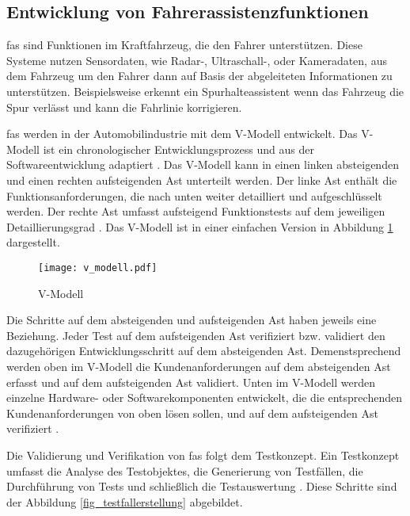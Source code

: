 \subsection{Entwicklung von Fahrerassistenzfunktionen}
\label{grundlagen_fahren_entwicklung}

\gls{fas} sind Funktionen im Kraftfahrzeug, die den Fahrer unterstützen. Diese Systeme nutzen Sensordaten, wie Radar-, Ultraschall-, oder Kameradaten, aus dem Fahrzeug um den Fahrer dann auf Basis der abgeleiteten Informationen zu unterstützen. Beispielsweise erkennt ein Spurhalteassistent wenn das Fahrzeug die Spur verlässt und kann die Fahrlinie korrigieren. 

\gls{fas} werden in der Automobilindustrie mit dem V-Modell entwickelt. Das V-Modell ist ein chronologischer Entwicklungsprozess und aus der Softwareentwicklung adaptiert \cite{vmodell2005}. Das V-Modell kann in einen linken absteigenden und einen rechten aufsteigenden Ast unterteilt werden. Der linke Ast enthält die Funktionsanforderungen, die nach unten weiter detailliert und aufgeschlüsselt werden. Der rechte Ast umfasst aufsteigend Funktionstests auf dem jeweiligen Detaillierungsgrad \cite{hakuli2015virtuelle}. Das V-Modell ist in einer einfachen Version in Abbildung \ref{fig_v_modell} dargestellt.

\begin{figure}[h]
\centering
\texttt{[image: v\_modell.pdf]}
\caption{V-Modell \cite{hakuli2015virtuelle}}
\label{fig_v_modell}
\end{figure}

Die Schritte auf dem absteigenden und aufsteigenden Ast haben jeweils eine Beziehung. Jeder Test auf dem aufsteigenden Ast verifiziert bzw. validiert den dazugehörigen Entwicklungsschritt auf dem absteigenden Ast. Demenstsprechend werden oben im V-Modell die Kundenanforderungen auf dem absteigenden Ast erfasst und auf dem aufsteigenden Ast validiert. Unten im V-Modell werden einzelne Hardware- oder Softwarekomponenten entwickelt, die die entsprechenden Kundenanforderungen von oben lösen sollen, und auf dem aufsteigenden Ast verifiziert \cite{hakuli2015virtuelle}.

Die Validierung und Verifikation von \gls{fas} folgt dem Testkonzept. Ein Testkonzept umfasst die Analyse des Testobjektes, die Generierung von Testfällen, die Durchführung von Tests und schließlich die Testauswertung \cite{schuldt2013effiziente}. Diese Schritte sind der Abbildung \ref{fig_testfallerstellung} abgebildet.

